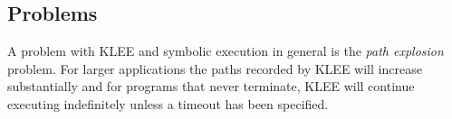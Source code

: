 \subsection{Problems}
A problem with KLEE and symbolic execution in general is the \emph{path
explosion} problem. For larger applications the paths recorded by KLEE will
increase substantially and for programs that never terminate, KLEE will
continue executing indefinitely unless a timeout has been specified.
